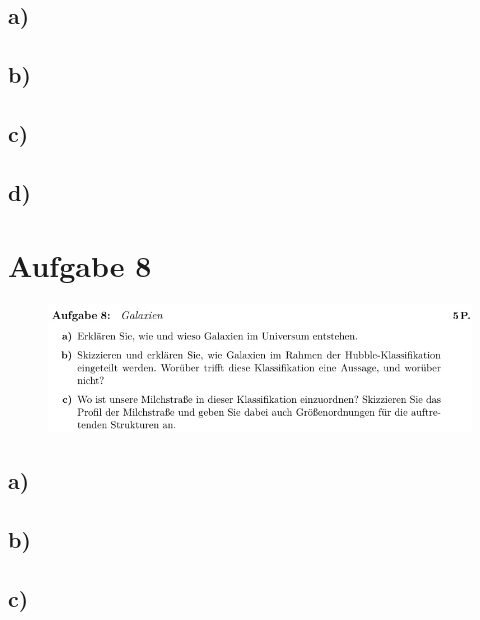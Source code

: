     \flushleft{\;}\justifying

\newpage
\subsection{a)}



\subsection{b)}



\subsection{c)}



\subsection{d)}



\section{Aufgabe 8}

\begin{figure}[H]
    \centering
    \includegraphics[width=\textwidth]{images/Aufgabe8.jpg}
    \label{fig:3}
\end{figure}

\newpage
\subsection{a)}



\subsection{b)}



\subsection{c)}



